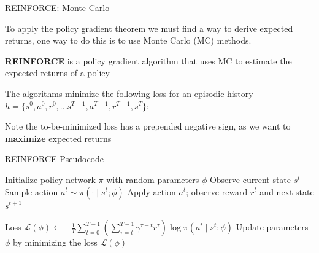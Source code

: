 \begin{frame}[t]{REINFORCE: Monte Carlo}

To apply the policy gradient theorem we must find a way to derive expected returns, one way to do this is to use Monte Carlo (MC) methods. 

\blist
    \item \textbf{REINFORCE} is a policy gradient algorithm that uses MC to estimate the expected returns of a policy
    \item<2-> The algorithms minimize the following loss for an episodic history $h = \{s^0, a^0, r^0, ... s^{T-1}, a^{T-1}, r^{T-1}, s^T\}$:
\elist
\vspace{0pt}

\blist
    \item<3-> Note the to-be-minimized loss has a prepended negative sign, as we want to \textbf{maximize} expected returns
\elist    
\end{frame}

\begin{frame}[t]{REINFORCE Pseudocode}

    \State Initialize policy network $\pi$ with random parameters $\phi$
            \State Observe current state $s^t$
            \State Sample action $a^t \sim \pi(\cdot \mid s^t; \phi)$
            \State Apply action $a^t$; observe reward $r^t$ and next state $s^{t+1}$
        \EndFor

        \State Loss $\mathcal{L}(\phi) \gets - \frac{1}{T} \sum_{t=0}^{T-1} \left(\sum_{\tau=t}^{T-1} \gamma^{\tau-t} r^\tau\right) \log \pi(a^t \mid s^t; \phi)$
        \State Update parameters $\phi$ by minimizing the loss $\mathcal{L}(\phi)$
    \EndFor
\ealg

\end{frame}

